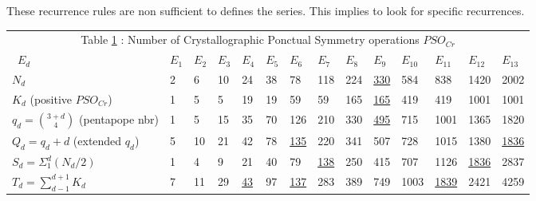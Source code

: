 \documentclass[a4paper,9pt]{article}
\newcounter{col}
\begin{document}
These recurrence rules are non sufficient to defines the series. This implies to look for specific recurrences.



\begin{table}
  \hskip-0.0cm\begin{tabular}{llllllllllllll}
    \toprule
    \multicolumn{14}{c}{Table \ref{tab:4:table4} : Number of Crystallographic Ponctual Symmetry operations $PSO_{Cr}$}                  \\
    \cmidrule(r){1-14}
      
      \ $E_d$  & $E_1 $ & $E_2$ & $E_3 $& $E_4$ &$ E_5$ &$ E_6 $&$ E_7$ &$ E_8$ & $E_9$ &$ E_{10} $&$ E_{11} $&$ E_{12}$&$ E_{13}$ \\
    \midrule
    
    $N_d$ & 2 & 6 & 10 & 24 & 38 & 78 & 118 & 224 & \underline{330} & 584 & 838 & 1420 & 2002  \\
       
    $K_d$ (positive $PSO_{Cr}$)  & 1 & 5 & 5 & 19 & 19 & 59 & 59 & 165 & \underline{165} & 419 & 419 & 1001& 1001 \\
    
     $q_d=\binom{3+d}{4}$ (pentapope nbr)  & 1 & 5 & 15 & 35 & 70 & 126 & 210 & 330 & \underline {495} & 715 & 1001 & 1365 & 1820\\
     
     $Q_d=q_d + d$  (extended $q_d$)   & 5 & 10 & 21 & 42 & 78 & \underline{135} & 220 & 341 & 507 & 728 & 1015 & 1380 & \underline{1836}\\
    
     
      
      $S_d=\Sigma_1^d (N_d/2)$   & 1 & 4 & 9 & 21 & 40 & 79 & \underline{138} & 250 & 415 & 707 & 1126 & \underline{1836} & 2837 \\
      
      $T_d =\sum_{d-1}^{d+1}K_d$   & 7 & 11 & 29 & \underline{43} & 97 & \underline{137} & 283 & 389 & 749 & 1003 & \underline{1839} & 2421 & 4259 \\

    \bottomrule
  \end{tabular}
\label{tab:4:table4}
\end{table}
\end{document}
